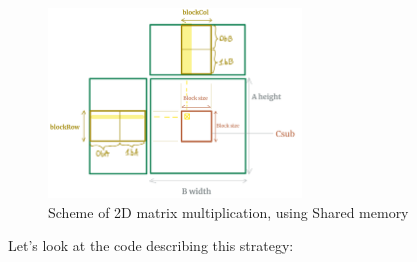\begin{figure}[ht!]
   \centering
   \includegraphics[width=0.6\textwidth]{pngs/globalmatrix.png}
   \vspace{-0.5cm}
   \caption{Scheme of 2D matrix multiplication, using Shared memory}
   \label{global2d}
\end{figure}


Let's look at the code describing this strategy:

